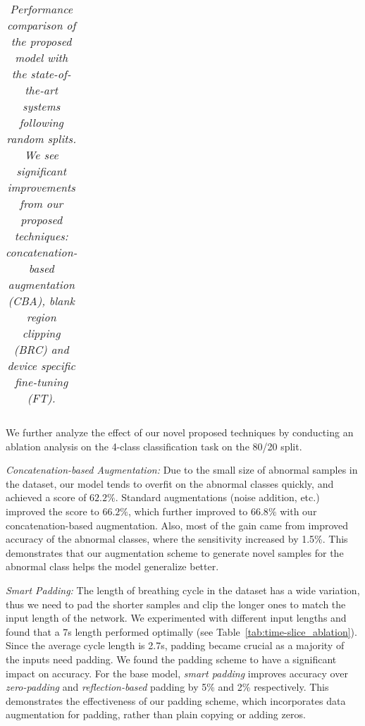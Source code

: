 \documentclass{article}
\begin{document}
\begin{table}[t]
{\begin{tabular}{ c | c | c c c}
 \bottomrule
\end{tabular}
 }
\vspace{-2mm}
\caption{\textit{Performance comparison of the proposed model with the state-of-the-art systems following random splits. We see significant improvements from our proposed techniques: concatenation-based augmentation (CBA), blank region clipping (BRC) and device specific fine-tuning (FT).}}
\label{tab:result_comparison}
\end{table}  We further analyze the effect of our novel proposed techniques by conducting an ablation analysis on the 4-class classification task on the 80/20 split.

\smallskip\noindent\textit{Concatenation-based Augmentation:}
Due to the small size of abnormal samples in the dataset, our model tends to overfit on the abnormal classes quickly, and achieved a score of $62.2\%$. Standard augmentations (noise addition, etc.) improved the score to $66.2\%$, which further improved to $66.8\%$ with our concatenation-based augmentation. Also, most of the gain came from improved accuracy of the abnormal classes, where the sensitivity increased by 1.5\%. This demonstrates that our augmentation scheme to generate novel samples for the abnormal class helps the model generalize better.


\begin{table}[t]
\centering
\vspace{-2mm}
\caption{\textit{Input length size  vs classification score.}}
\vspace*{-12pt}
\label{tab:time-slice_ablation}
\end{table} \smallskip\noindent\textit{Smart Padding:} The length of breathing cycle in the dataset has a wide variation, thus we need to pad the shorter samples and clip the longer ones to match the input length of the network. We experimented with different input lengths and found that a 7s length performed optimally (see Table~\ref{tab:time-slice_ablation}). Since the average cycle length is 2.7s, padding became crucial as a majority of the inputs need padding. We found the padding scheme to have a significant impact on accuracy. For the base model, \textit{smart padding} improves accuracy over \textit{zero-padding} and \textit{reflection-based} padding by 5\% and 2\% respectively. This demonstrates the effectiveness of our padding scheme, which incorporates data augmentation for padding, rather than plain copying or adding zeros.
\end{document}
